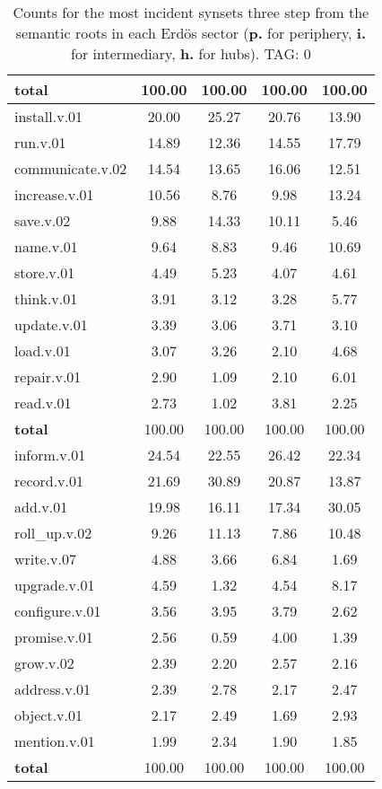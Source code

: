 \begin{table}[h!]
\begin{center}
\begin{tabular}{| l || c | c | c | c |}
{{\bf total}} & 100.00  & 100.00  & 100.00  & 100.00 \\\hline\hline\hline
install.v.01 & 20.00  & 25.27  & 20.76  & 13.90 \\\hline
run.v.01 & 14.89  & 12.36  & 14.55  & 17.79 \\\hline
communicate.v.02 & 14.54  & 13.65  & 16.06  & 12.51 \\\hline
increase.v.01 & 10.56  & 8.76  & 9.98  & 13.24 \\\hline
save.v.02 & 9.88  & 14.33  & 10.11  & 5.46 \\\hline
name.v.01 & 9.64  & 8.83  & 9.46  & 10.69 \\\hline
store.v.01 & 4.49  & 5.23  & 4.07  & 4.61 \\\hline
think.v.01 & 3.91  & 3.12  & 3.28  & 5.77 \\\hline
update.v.01 & 3.39  & 3.06  & 3.71  & 3.10 \\\hline
load.v.01 & 3.07  & 3.26  & 2.10  & 4.68 \\\hline
repair.v.01 & 2.90  & 1.09  & 2.10  & 6.01 \\\hline
read.v.01 & 2.73  & 1.02  & 3.81  & 2.25 \\\hline\hline
{{\bf total}} & 100.00  & 100.00  & 100.00  & 100.00 \\\hline\hline\hline
inform.v.01 & 24.54  & 22.55  & 26.42  & 22.34 \\\hline
record.v.01 & 21.69  & 30.89  & 20.87  & 13.87 \\\hline
add.v.01 & 19.98  & 16.11  & 17.34  & 30.05 \\\hline
roll\_up.v.02 & 9.26  & 11.13  & 7.86  & 10.48 \\\hline
write.v.07 & 4.88  & 3.66  & 6.84  & 1.69 \\\hline
upgrade.v.01 & 4.59  & 1.32  & 4.54  & 8.17 \\\hline
configure.v.01 & 3.56  & 3.95  & 3.79  & 2.62 \\\hline
promise.v.01 & 2.56  & 0.59  & 4.00  & 1.39 \\\hline
grow.v.02 & 2.39  & 2.20  & 2.57  & 2.16 \\\hline
address.v.01 & 2.39  & 2.78  & 2.17  & 2.47 \\\hline
object.v.01 & 2.17  & 2.49  & 1.69  & 2.93 \\\hline
mention.v.01 & 1.99  & 2.34  & 1.90  & 1.85 \\\hline\hline
{{\bf total}} & 100.00  & 100.00  & 100.00  & 100.00 \\\hline
\end{tabular}
\caption{Counts for the most incident synsets three step from the semantic roots in each Erd\"os sector ({\bf p.} for periphery, {\bf i.} for intermediary, {\bf h.} for hubs). TAG: 0}
\end{center}
\end{table}